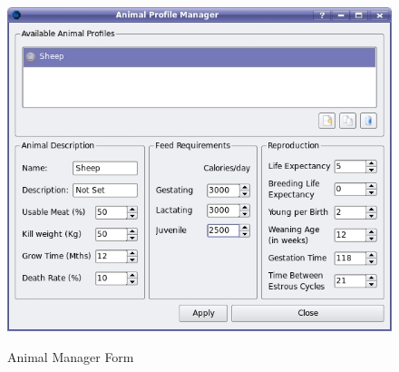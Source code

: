 \begin{figure}[htbp]
    \includegraphics[scale=.39]{./images/animalManager.jpg}
 \label{fig:animalManager} \caption{Animal Manager Form}
\end{figure}


